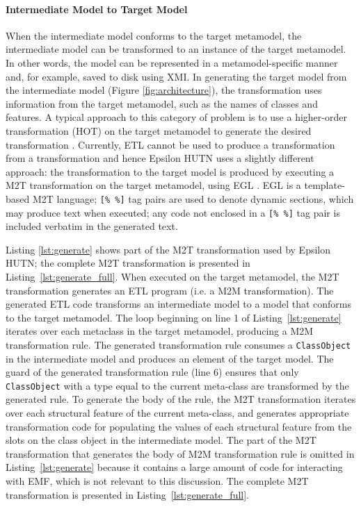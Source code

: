 \paragraph{Intermediate Model to Target Model}
When the intermediate model conforms to the target metamodel, the intermediate model can be transformed to an instance of the target metamodel. In other words, the model can be represented in a metamodel-specific manner and, for example, saved to disk using XMI. In generating the target model from the intermediate model (Figure \ref{fig:architecture}), the transformation uses information from the target metamodel, such as the names of classes and features. A typical approach to this category of problem is to use a higher-order transformation (HOT) on the target metamodel to generate the desired transformation \cite{tisi09hot}. Currently, ETL cannot be used to produce a transformation from a transformation and hence Epsilon HUTN uses a slightly different approach: the transformation to the target model is produced by executing a M2T transformation on the target metamodel, using EGL \cite{rose08egl}. EGL is a template-based M2T language; \verb|[% %]| tag pairs are used to denote dynamic sections, which may produce text when executed; any code not enclosed in a \verb|[% %]| tag pair is included verbatim in the generated text.

Listing \ref{lst:generate} shows part of the M2T transformation used by Epsilon HUTN; the complete M2T transformation is presented in Listing~\ref{lst:generate_full}. When executed on the target metamodel, the M2T transformation generates an ETL program (i.e. a M2M transformation). The generated ETL code transforms an intermediate model to a model that conforms to the target metamodel. The loop beginning on line 1 of Listing~\ref{lst:generate} iterates over each metaclass in the target metamodel, producing a M2M transformation rule. The generated transformation rule consumes a \texttt{Cl\-a\-ssOb\-je\-ct} in the intermediate model and produces an element of the target model. The guard of the generated transformation rule (line 6) ensures that only \texttt{Cl\-a\-ssOb\-je\-ct} with a type equal to the current meta-class are transformed by the generated rule. To generate the body of the rule, the M2T transformation iterates over each structural feature of the current meta-class, and generates appropriate transformation code for populating the values of each structural feature from the slots on the class object in the intermediate model. The part of the M2T transformation that generates the body of M2M transformation rule is omitted in Listing~\ref{lst:generate} because it contains a large amount of code for interacting with EMF, which is not relevant to this discussion. The complete M2T transformation is presented in Listing~\ref{lst:generate_full}.

